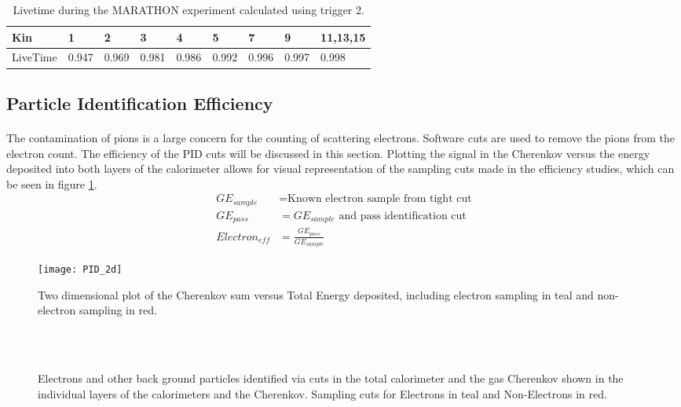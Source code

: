 \begin{table}[]
	\centering
	\caption{Livetime during the MARATHON experiment calculated using trigger 2.  }
\label{LTtable}
	\begin{tabular}{|l|l|l|l|l|l|l|l|l|}
		\hline
		Kin      & 1 & 2 & 3 & 4 & 5 & 7 & 9 & 11,13,15 \\ \hline
		LiveTime & 0.947 & 0.969 & 0.981 & 0.986 & 0.992 & 0.996 & 0.997 & 0.998\\ \hline
	\end{tabular}

\end{table}
  

\subsection{Particle Identification Efficiency}\label{ss:PID}
\paragraph{} The contamination of pions is a large concern for the counting of scattering electrons. Software cuts are used to remove the pions from the electron count. The efficiency of the PID cuts will be discussed in this section. Plotting the signal in the Cherenkov versus the energy deposited into both layers of the calorimeter allows for visual representation of the sampling cuts made in the efficiency studies, which can be seen in figure \ref{elesample}. 
\begin{equation}\label{effequ}
\begin{split}
GE_{sample} & = \textrm{Known electron sample from tight cut}  \\
GE_{pass} & = \textrm{$GE_{sample}$ and pass identification cut} \\
Electron_{eff}  & = \frac{ GE_{pass} } { GE_{sample} } 
\end{split}
\end{equation}
\begin{figure}[]
	\centering

	\texttt{[image: PID\_2d]}
	\caption{Two dimensional plot of the Cherenkov sum versus Total Energy deposited, including electron sampling in teal and non-electron sampling in red. }
	\label{elesample}
\end{figure}

\begin{figure}[t!]%

	\centering
	\\
	\\%
			\caption{Electrons and other back ground particles identified via cuts in the total calorimeter and the gas Cherenkov shown in the individual layers of the calorimeters and the Cherenkov. Sampling cuts for Electrons in teal and Non-Electrons in red.}%
	\label{sampling}%
\end{figure}


